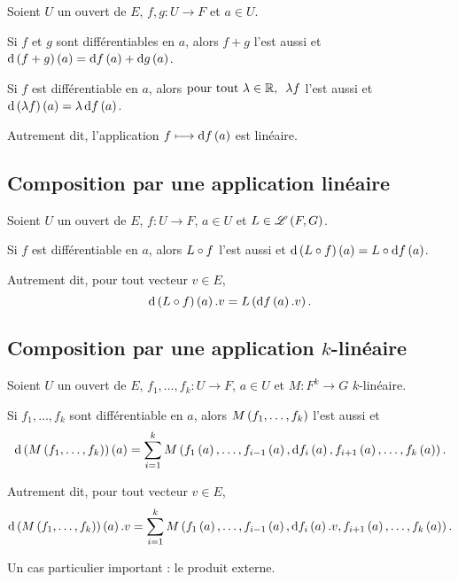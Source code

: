 \begin{prop}
Soient \(U\) un ouvert de \(E\), \(f,g:U\to F\) et \(a\in U\).

Si \(f\) et \(g\) sont différentiables en \(a\), alors \(f+g\) l'est aussi et \(\odif{\paren{f+g}}\paren{a}=\odif{f}\paren{a}+\odif{g}\paren{a}\).

Si \(f\) est différentiable en \(a\), alors \(\quantifs{\tpt\lambda\in\R}\lambda f\) l'est aussi et \(\odif{\paren{\lambda f}}\paren{a}=\lambda\odif{f}\paren{a}\).
\end{prop}

Autrement dit, l'application \(f\mapsto\odif{f}\paren{a}\) est linéaire.

\subsection{Composition par une application linéaire}

\begin{prop}
Soient \(U\) un ouvert de \(E\), \(f:U\to F\), \(a\in U\) et \(L\in\mathscr{L}\left(F,G\right)\).

Si \(f\) est différentiable en \(a\), alors \(L\circ f\) l'est aussi et \(\odif{\paren{L\rond f}}\paren{a}=L\rond\odif{f}\paren{a}\).
\end{prop}

Autrement dit, pour tout vecteur \(v\in E\), \[\odif{\paren{L\rond f}}\paren{a}.v=L\paren{\odif{f}\paren{a}.v}.\]

\subsection{Composition par une application \(k\)-linéaire}

\begin{prop}
Soient \(U\) un ouvert de \(E\), \(f_1,\dots,f_k:U\to F\), \(a\in U\) et \(M:F^k\to G\) \(k\)-linéaire.

Si \(f_1,\dots,f_k\) sont différentiable en \(a\), alors \(M\left(f_1,\dots,f_k\right)\) l'est aussi et \[\odif{\paren{M\paren{f_1,\dots,f_k}}}\paren{a}=\sum_{i=1}^kM\paren{f_1\paren{a},\dots,f_{i-1}\paren{a},\odif{f_i}\paren{a},f_{i+1}\paren{a},\dots,f_k\paren{a}}.\]
\end{prop}

Autrement dit, pour tout vecteur \(v\in E\), \[\odif{\paren{M\paren{f_1,\dots,f_k}}}\paren{a}.v=\sum_{i=1}^kM\paren{f_1\paren{a},\dots,f_{i-1}\paren{a},\odif{f_i}\paren{a}.v,f_{i+1}\paren{a},\dots,f_k\paren{a}}.\]

Un cas particulier important : le produit externe.

